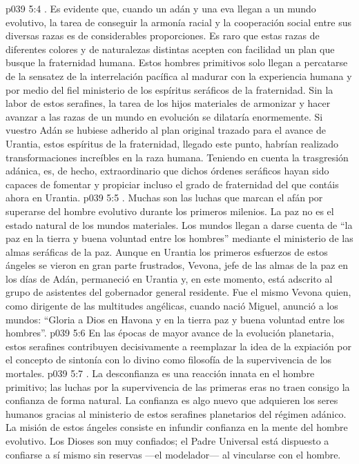 \vs p039 5:4 . Es evidente que, cuando un adán y una eva llegan a un mundo evolutivo, la tarea de conseguir la armonía racial y la cooperación social entre sus diversas razas es de considerables proporciones. Es raro que estas razas de diferentes colores y de naturalezas distintas acepten con facilidad un plan que busque la fraternidad humana. Estos hombres primitivos solo llegan a percatarse de la sensatez de la interrelación pacífica al madurar con la experiencia humana y por medio del fiel ministerio de los espíritus seráficos de la fraternidad. Sin la labor de estos serafines, la tarea de los hijos materiales de armonizar y hacer avanzar a las razas de un mundo en evolución se dilataría enormemente. Si vuestro Adán se hubiese adherido al plan original trazado para el avance de Urantia, estos espíritus de la fraternidad, llegado este punto, habrían realizado transformaciones increíbles en la raza humana. Teniendo en cuenta la trasgresión adánica, es, de hecho, extraordinario que dichos órdenes seráficos hayan sido capaces de fomentar y propiciar incluso el grado de fraternidad del que contáis ahora en Urantia.
\vs p039 5:5 . Muchas son las luchas que marcan el afán por superarse del hombre evolutivo durante los primeros milenios. La paz no es el estado natural de los mundos materiales. Los mundos llegan a darse cuenta de “la paz en la tierra y buena voluntad entre los hombres” mediante el ministerio de las almas seráficas de la paz. Aunque en Urantia los primeros esfuerzos de estos ángeles se vieron en gran parte frustrados, Vevona, jefe de las almas de la paz en los días de Adán, permaneció en Urantia y, en este momento, está adscrito al grupo de asistentes del gobernador general residente. Fue el mismo Vevona quien, como dirigente de las multitudes angélicas, cuando nació Miguel, anunció a los mundos: “Gloria a Dios en Havona y en la tierra paz y buena voluntad entre los hombres”.
\vs p039 5:6 En las épocas de mayor avance de la evolución planetaria, estos serafines contribuyen decisivamente a reemplazar la idea de la expiación por el concepto de sintonía con lo divino como filosofía de la supervivencia de los mortales.
\vs p039 5:7 . La desconfianza es una reacción innata en el hombre primitivo; las luchas por la supervivencia de las primeras eras no traen consigo la confianza de forma natural. La confianza es algo nuevo que adquieren los seres humanos gracias al ministerio de estos serafines planetarios del régimen adánico. La misión de estos ángeles consiste en infundir confianza en la mente del hombre evolutivo. Los Dioses son muy confiados; el Padre Universal está dispuesto a confiarse a sí mismo sin reservas ---el modelador--- al vincularse con el hombre.

